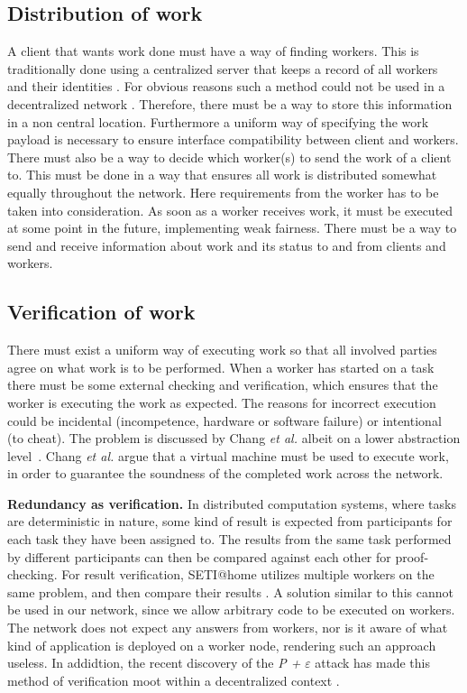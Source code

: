 \subsection{Distribution of work}
A client that wants work done must have a way of finding workers. This is traditionally done using a centralized server that keeps a record of all workers and their identities \cite{anderson:2005}\cite{sarmenta:2002}. For obvious reasons such a method could not be used in a decentralized network \cite{baran}. Therefore, there must be a way to store this information in a non central location. Furthermore a uniform way of specifying the work payload is necessary to ensure interface compatibility between client and workers. There must also be a way to decide which worker(s) to send the work of a client to. This must be done in a way that ensures all work is distributed somewhat equally throughout the network. Here requirements from the worker has to be taken into consideration. As soon as a worker receives work, it must be executed at some point in the future, implementing weak fairness. There must be a way to send and receive information about work and its status to and from clients and workers.

\subsection{Verification of work}
There must exist a uniform way of executing work so that all involved parties agree on what work is to be performed. When a worker has started on a task there must be some external checking and verification, which ensures that the worker is executing the work as expected. The reasons for incorrect execution could be incidental (incompetence, hardware or software failure) or intentional (to cheat). The problem is discussed by Chang \textit{et al.} albeit on a lower abstraction level~\cite{concert}. Chang \textit{et al.} argue that a virtual machine must be used to execute work, in order to guarantee the soundness of the completed work across the network.

\textbf{Redundancy as verification.} In distributed computation systems, where tasks are deterministic in nature, some kind of result is expected from participants for each task they have been assigned to. The results from the same task performed by different participants can then be compared against each other for proof-checking. For result verification, SETI@home utilizes multiple workers on the same problem, and then compare their results \cite{korpela:2001}. A solution similar to this cannot be used in our network, since we allow arbitrary code to be executed on workers. The network does not expect any answers from workers, nor is it aware of what kind of application is deployed on a worker node, rendering such an approach useless. In addidtion, the recent discovery of the \emph{P +} $\varepsilon$ attack has made this method of verification moot within a decentralized context \cite{buterin:2015}.

